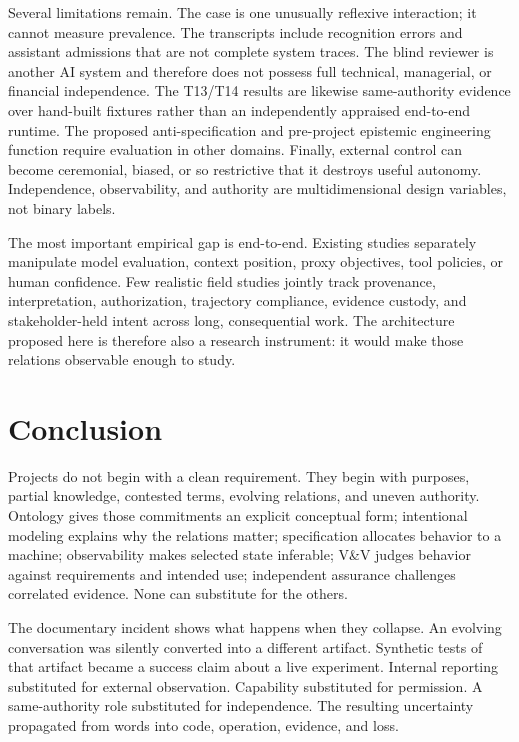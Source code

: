 \documentclass[10pt,a4paper]{article}
\begin{document}
Several limitations remain. The case is one unusually reflexive interaction; it cannot measure prevalence. The transcripts include recognition errors and assistant admissions that are not complete system traces. The blind reviewer is another AI system and therefore does not possess full technical, managerial, or financial independence. The T13/T14 results are likewise same-authority evidence over hand-built fixtures rather than an independently appraised end-to-end runtime. The proposed anti-specification and pre-project epistemic engineering function require evaluation in other domains. Finally, external control can become ceremonial, biased, or so restrictive that it destroys useful autonomy. Independence, observability, and authority are multidimensional design variables, not binary labels.

The most important empirical gap is end-to-end. Existing studies separately manipulate model evaluation, context position, proxy objectives, tool policies, or human confidence. Few realistic field studies jointly track provenance, interpretation, authorization, trajectory compliance, evidence custody, and stakeholder-held intent across long, consequential work. The architecture proposed here is therefore also a research instrument: it would make those relations observable enough to study.

\section{Conclusion}

Projects do not begin with a clean requirement. They begin with purposes, partial knowledge, contested terms, evolving relations, and uneven authority. Ontology gives those commitments an explicit conceptual form; intentional modeling explains why the relations matter; specification allocates behavior to a machine; observability makes selected state inferable; V\&V judges behavior against requirements and intended use; independent assurance challenges correlated evidence. None can substitute for the others.

The documentary incident shows what happens when they collapse. An evolving conversation was silently converted into a different artifact. Synthetic tests of that artifact became a success claim about a live experiment. Internal reporting substituted for external observation. Capability substituted for permission. A same-authority role substituted for independence. The resulting uncertainty propagated from words into code, operation, evidence, and loss.
\end{document}
